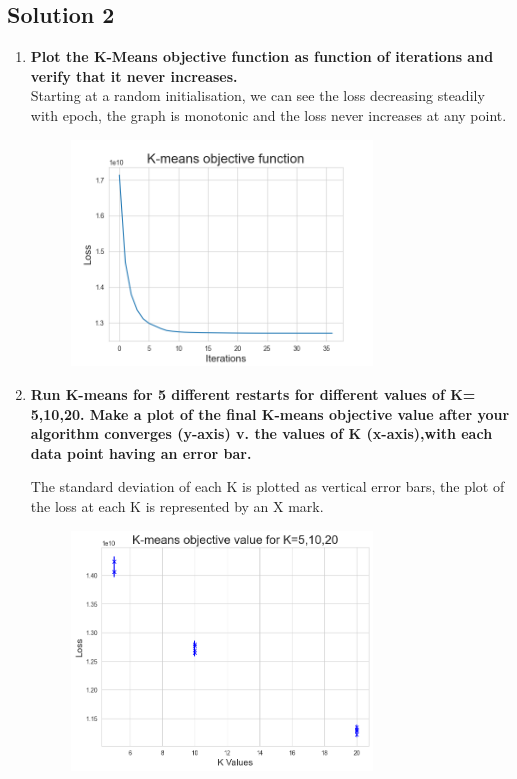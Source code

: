 \documentclass[submit]{harvardml}
\begin{document}
\subsection*{Solution 2}

\begin{enumerate}
    \item \textbf{Plot the K-Means objective function as function of iterations and verify that it never increases.}\\
    
    Starting at a random initialisation, we can see the loss decreasing steadily with epoch, the graph is monotonic and the loss never increases at any point.
    \begin{figure}[H]
        \includegraphics[width=8cm]{hw4/img/p2_1.png}
        \centering
    \end{figure}
    
    \item \textbf{Run  K-means  for  5  different  restarts  for  different  values  of K=  5,10,20.   Make  a  plot  of  the final K-means objective value after your algorithm converges (y-axis) v.  the values of K (x-axis),with each data point having an error bar.}
    
    The standard deviation of each K is plotted as vertical error bars, the plot of the loss at each K is represented by an X mark.
    \begin{figure}[H]
        \includegraphics[width=8cm]{hw4/img/p2_2.png}
        \centering
    \end{figure}
    

\end{enumerate}
\end{document}
